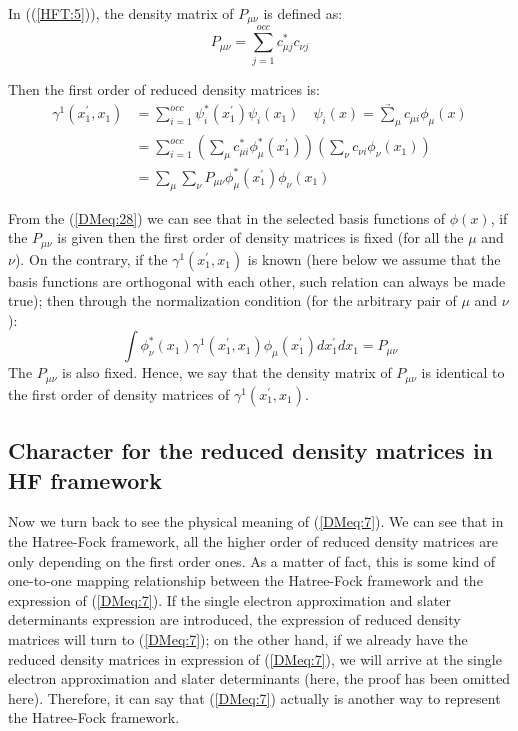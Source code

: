In ((\ref{HFT:5})), the density matrix of $P_{\mu\nu}$ is defined
as:
\begin{equation}
  \label{DMeq:27}
P_{\mu\nu} = \sum^{occ}_{j=1}c^{*}_{\mu j}c_{\nu j}
\end{equation}

Then the first order of reduced density matrices is:
\begin{align}
    \label{DMeq:28}
    \gamma^{1}(x_{1}^{'}, x_{1}) &=
\sum_{i=1}^{occ}\psi^{*}_{i}(x^{'}_{1})\psi_{i}(x_{1}) \quad
\underrightarrow{\psi_{i}(x) = \sum_{\mu}c_{\mu i}\phi_{\mu}(x)}
\nonumber \\
&= \sum_{i=1}^{occ}\left( \sum_{\mu}c^{*}_{\mu i}\phi^{*}_{\mu}(x^{'}_{1}) \right)
\left( \sum_{\nu}c_{\nu i}\phi_{\nu}(x_{1}) \right) \nonumber \\
&=\sum_{\mu}\sum_{\nu}P_{\mu\nu}\phi^{*}_{\mu}(x^{'}_{1})\phi_{\nu}(x_{1})
\end{align}

From the (\ref{DMeq:28}) we can see that in the selected basis
functions of $\phi(x)$, if the $P_{\mu\nu}$ is given then the
first order of density matrices is fixed (for all the $\mu$ and
$\nu$). On the contrary, if the $\gamma^{1}(x_{1}^{'}, x_{1})$ is
known (here below we assume that the basis functions are orthogonal
with each other, such relation can always be made true); then
through the normalization condition (for the arbitrary pair of $\mu$
and $\nu$):
\begin{equation}
  \label{DMeq:29}
  \int \phi^{*}_{\nu}(x_{1})\gamma^{1}(x_{1}^{'},
  x_{1})\phi_{\mu}(x^{'}_{1})dx^{'}_{1}dx_{1} = P_{\mu\nu}
\end{equation}
The $P_{\mu\nu}$ is also fixed. Hence, we say that the density
matrix of $P_{\mu\nu}$ is identical to the first order of
density matrices of $\gamma^{1}(x_{1}^{'},x_{1})$.

\subsection{Character for the reduced density matrices in HF framework}
%
%
%
%
Now we turn back to see the physical meaning of (\ref{DMeq:7}). We
can see that in the Hatree-Fock framework, all the higher order of
reduced density matrices are only depending on the first order ones.
As a matter of fact, this is some kind of one-to-one mapping
relationship between the Hatree-Fock framework and the expression of
(\ref{DMeq:7})\cite{weitaoYang}. If the single electron
approximation and slater determinants expression are introduced, the
expression of reduced density matrices will turn to (\ref{DMeq:7});
on the other hand, if we already have the reduced density matrices
in expression of (\ref{DMeq:7}), we will arrive at the single
electron approximation and slater determinants (here, the proof has
been omitted here). Therefore, it can say that (\ref{DMeq:7})
actually is another way to represent the Hatree-Fock framework.

